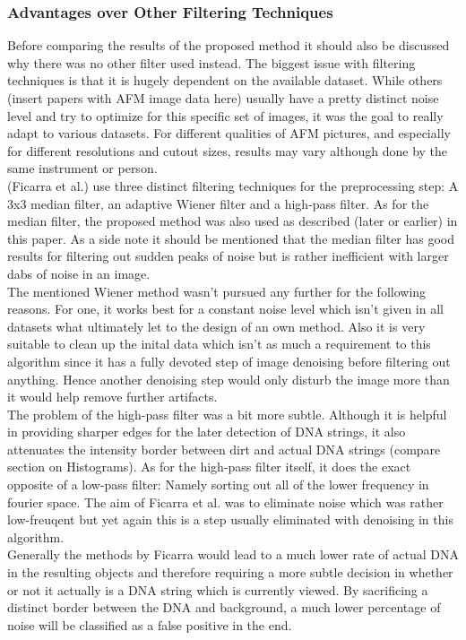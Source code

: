 \documentclass{article}
\begin{document}
\subsubsection{Advantages over Other Filtering Techniques}\label{sec:Advantages over Other Filtering Techniques}
Before comparing the results of the proposed method it should also be discussed why there was no other filter used instead.
The biggest issue with filtering techniques is that it is hugely dependent on the available dataset. While others (insert papers with AFM image data here) usually have a pretty distinct noise level and try to optimize for this specific set of images, it was the goal to really adapt to various datasets. For different qualities of AFM pictures, and especially for different resolutions and cutout sizes, results may vary although done by the same instrument or person. \\
(Ficarra et al.) use three distinct filtering techniques for the preprocessing step: A 3x3 median filter, an adaptive Wiener filter and a high-pass filter. As for the median filter, the proposed method was also used as described (later or earlier) in this paper. As a side note it should be mentioned that the median filter has good results for filtering out sudden peaks of noise but is rather inefficient with larger dabs of noise in an image. \\
The mentioned Wiener method wasn't pursued any further for the following reasons. For one, it works best for a constant noise level which isn't given in all datasets what ultimately let to the design of an own method. Also it is very suitable to clean up the inital data which isn't as much a requirement to this algorithm since it has a fully devoted step of image denoising before filtering out anything. Hence another denoising step would only disturb the image more than it would help remove further artifacts. \\
The problem of the high-pass filter was a bit more subtle. Although it is helpful in providing sharper edges for the later detection of DNA strings, it also attenuates the intensity border between dirt and actual DNA strings (compare section on Histograms). As for the high-pass filter itself, it does the exact opposite of a low-pass filter: Namely sorting out all of the lower frequency in fourier space. The aim of Ficarra et al. was to eliminate noise which was rather low-freuqent but yet again this is a step usually eliminated with denoising in this algorithm. \\
Generally the methods by Ficarra would lead to a much lower rate of actual DNA in the resulting objects and therefore requiring a more subtle decision in whether or not it actually is a DNA string which is currently viewed. By sacrificing a distinct border between the DNA and background, a much lower percentage of noise will be classified as a false positive in the end.
\end{document}

